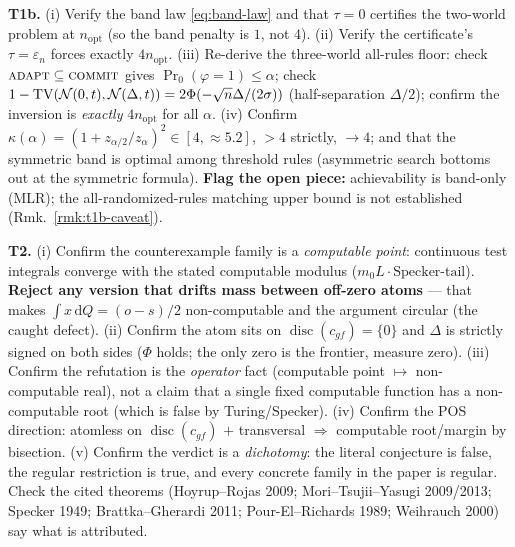 \noindent\textbf{T1b.} (i) Verify the band law \eqref{eq:band-law} and that $\tau=0$ certifies
the two-world problem at $n_{\mathrm{opt}}$ (so the band penalty is $1$, not $4$). (ii) Verify
the certificate's $\tau=\varepsilon_n$ forces exactly $4n_{\mathrm{opt}}$. (iii) Re-derive the
three-world all-rules floor: check $\textsc{adapt}\subseteq\textsc{commit}$ gives
$\Pr_0(\varphi=1)\le\alpha$; check $1-\mathrm{TV}(\mathcal N(0,t),\mathcal N(\Delta,t))=2\Phi(-\sqrt n\Delta/(2\sigma))$
(half-separation $\Delta/2$); confirm the inversion is \emph{exactly} $4n_{\mathrm{opt}}$ for all
$\alpha$. (iv) Confirm $\kappa(\alpha)=(1+z_{\alpha/2}/z_\alpha)^2\in[4,\approx5.2]$, $>4$
strictly, $\to4$; and that the symmetric band is optimal among threshold rules (asymmetric
search bottoms out at the symmetric formula). \textbf{Flag the open piece:} achievability is
band-only (MLR); the all-randomized-rules matching upper bound is not established
(Rmk.~\ref{rmk:t1b-caveat}).

\noindent\textbf{T2.} (i) Confirm the counterexample family is a \emph{computable point}:
continuous test integrals converge with the stated computable modulus
($m_0L\cdot\text{Specker-tail}$). \textbf{Reject any version that drifts mass between off-zero
atoms} --- that makes $\int x\,\mathrm dQ=(o-s)/2$ non-computable and the argument circular (the
caught defect). (ii) Confirm the atom sits on $\operatorname{disc}(c_{gf})=\{0\}$ and $\Delta$
is strictly signed on both sides ($\Phi$ holds; the only zero is the frontier, measure zero).
(iii) Confirm the refutation is the \emph{operator} fact (computable point $\mapsto$
non-computable real), not a claim that a single fixed computable function has a non-computable
root (which is false by Turing/Specker). (iv) Confirm the POS direction: atomless on
$\operatorname{disc}(c_{gf})$ $+$ transversal $\Rightarrow$ computable root/margin by bisection.
(v) Confirm the verdict is a \emph{dichotomy}: the literal conjecture is false, the regular
restriction is true, and every concrete family in the paper is regular. Check the cited
theorems (Hoyrup--Rojas 2009; Mori--Tsujii--Yasugi 2009/2013; Specker 1949; Brattka--Gherardi
2011; Pour-El--Richards 1989; Weihrauch 2000) say what is attributed.
